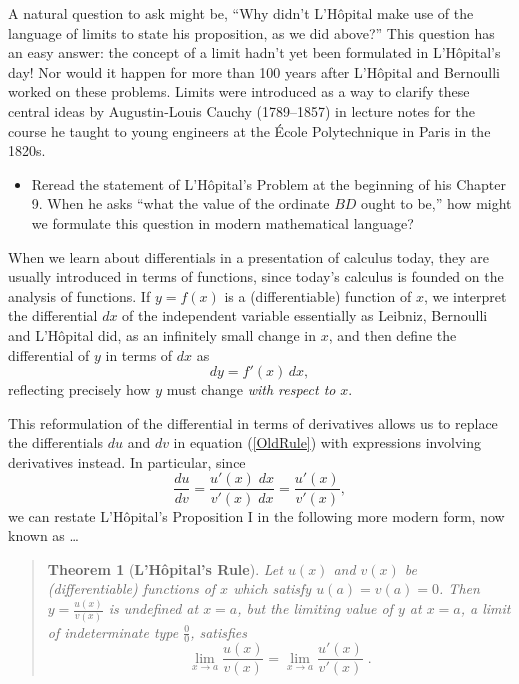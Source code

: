 \message{ !name(LHopitalsRule_2021.03.29.tex)}\documentclass[11pt]{article}
\newtheorem*{thm*}{Theorem}
\newcounter{tasknumb}
\newcommand{\tasknumb}[1]{\refstepcounter{tasknumb}\textmd{\textbf{$\fbox{$\fbox{Task \thetasknumb}$}$}}#1}
\newenvironment{task}[1][]%
 {\begin{itemize}
 \item[\tasknumb{#1}] }
{
    \end{itemize}    }%
\begin{document}
\bigskip
A natural question to ask might be, ``Why didn't L'H\^opital make use of the language of limits to state his proposition, as we did above?'' This question has an easy answer: the concept of a limit hadn't yet been formulated in L'H\^opital's day! Nor would it happen for more than 100 years after L'H\^opital and Bernoulli worked on these problems. Limits were introduced as a way to clarify these central ideas by Augustin-Louis Cauchy (1789--1857) in lecture notes for the course he taught to young engineers at the \'Ecole Polytechnique in Paris in the 1820s.

\begin{task}
Reread the statement of L'H\^opital's Problem at the beginning of his Chapter 9. When he asks ``what the value of the ordinate $BD$ ought to be,'' how might we formulate this question in modern mathematical language?
\end{task}

\bigskip
When we learn about differentials in a presentation of calculus today, they are usually introduced in terms of functions, since today's calculus is founded on the analysis of functions. If $y=f(x)$ is a (differentiable) function of $x$, we interpret the differential $dx$ of the independent variable essentially as Leibniz, Bernoulli and L'H\^opital did, as an infinitely small change in $x$, and then define the differential of $y$ in terms of $dx$ as
\begin{equation} \label{eqn4}
dy=f'(x)\,dx,
\end{equation}
reflecting precisely how $y$ must change \emph{with respect to} $x$.

This reformulation of the differential in terms of derivatives allows us to replace the differentials $du$ and $dv$ in equation (\ref{OldRule}) with expressions involving derivatives instead. In particular, since $$\frac{du}{dv}=\frac{u'(x)\;dx}{v'(x)\;dx}=\frac{u'(x)}{v'(x)},$$we can restate L'H\^opital's Proposition I in the following more modern form, now known as \dots

\vspace{-0.25in}
\begin{quote}
\begin{thm*}[{\bf L'H\^opital's Rule}]
Let $u(x)$ and $v(x)$ be (differentiable) functions of $x$ which satisfy $u(a)=v(a)=0$. Then ${\displaystyle y=\frac{u(x)}{v(x)}}$ is undefined at $x=a$, but the limiting value of $y$ at $x=a$, a limit of indeterminate type ${\displaystyle \frac00}$, satisfies
	\begin{equation}\label{LR}
	\lim_{x\to a} \frac{u(x)}{v(x)}=\lim_{x\to a} \frac{u'(x)}{v'(x)}\;.
	\end{equation}
\end{thm*}
\end{quote}
\end{document}
